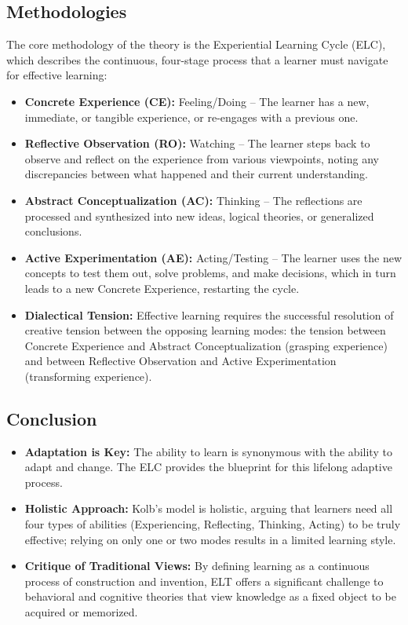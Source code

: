 \documentclass[12pt,a4paper]{report}
\begin{document}
\subsection{Methodologies}
The core methodology of the theory is the Experiential Learning Cycle (ELC), which describes the continuous, four-stage process that a learner must navigate for effective learning:
\begin{itemize}
  \item \textbf{Concrete Experience (CE):} Feeling/Doing -- The learner has a new, immediate, or tangible experience, or re-engages with a previous one.
  \item \textbf{Reflective Observation (RO):} Watching -- The learner steps back to observe and reflect on the experience from various viewpoints, noting any discrepancies between what happened and their current understanding.
  \item \textbf{Abstract Conceptualization (AC):} Thinking -- The reflections are processed and synthesized into new ideas, logical theories, or generalized conclusions.
  \item \textbf{Active Experimentation (AE):} Acting/Testing -- The learner uses the new concepts to test them out, solve problems, and make decisions, which in turn leads to a new Concrete Experience, restarting the cycle.
  \item \textbf{Dialectical Tension:} Effective learning requires the successful resolution of creative tension between the opposing learning modes: the tension between Concrete Experience and Abstract Conceptualization (grasping experience) and between Reflective Observation and Active Experimentation (transforming experience).
\end{itemize}

\subsection{Conclusion}
\begin{itemize}
  \item \textbf{Adaptation is Key:} The ability to learn is synonymous with the ability to adapt and change. The ELC provides the blueprint for this lifelong adaptive process.
  \item \textbf{Holistic Approach:} Kolb’s model is holistic, arguing that learners need all four types of abilities (Experiencing, Reflecting, Thinking, Acting) to be truly effective; relying on only one or two modes results in a limited learning style.
  \item \textbf{Critique of Traditional Views:} By defining learning as a continuous process of construction and invention, ELT offers a significant challenge to behavioral and cognitive theories that view knowledge as a fixed object to be acquired or memorized.
\end{itemize}
\end{document}
